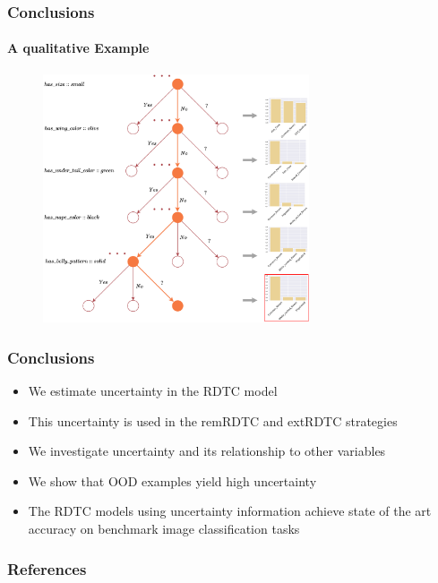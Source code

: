 \documentclass[9pt]{beamer}
\begin{document}
\begin{frame}
\frametitle{Conclusions}
\framesubtitle{A qualitative Example}
\begin{figure}
	\centering
	\includegraphics[width=0.7\textwidth]{images/example_tree.pdf}
\label{fig:example_tree}
\end{figure}
\end{frame} 







\begin{frame}
\frametitle{Conclusions}
\begin{itemize}
	\item We estimate uncertainty in the RDTC model
	\item This uncertainty is used in the remRDTC and extRDTC strategies
	\item We investigate uncertainty and its relationship to other variables
	\item We show that OOD examples yield high uncertainty
	\item The RDTC models using uncertainty information achieve state of the art accuracy on benchmark image classification tasks
\end{itemize}
\end{frame}




\begin{frame}
\frametitle{References}
	
	
\end{frame}
\end{document}
